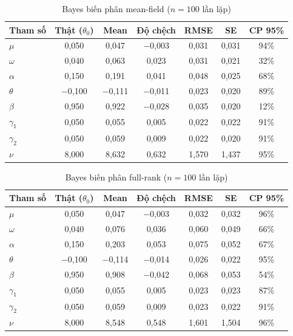 \documentclass[11pt,a4paper]{article}
\begin{document}
\begin{table}[H]\centering\footnotesize
\caption{Bayes biến phân mean-field ($n=100$ lần lặp)}
\begin{tabularx}{\textwidth}{l C C C C C C}
\toprule
\textbf{Tham số} & \textbf{Thật ($\theta_0$)} & \textbf{Mean} & \textbf{Độ chệch} & \textbf{RMSE} & \textbf{SE} & \textbf{CP 95\%} \\
\midrule
$\mu$ & 0,050 & 0,047 & $-$0,003 & 0,031 & 0,031 & 94\% \\
$\omega$ & 0,040 & 0,063 & 0,023 & 0,031 & 0,021 & 32\% \\
$\alpha$ & 0,150 & 0,191 & 0,041 & 0,048 & 0,025 & 68\% \\
$\theta$ & $-$0,100 & $-$0,111 & $-$0,011 & 0,023 & 0,020 & 89\% \\
$\beta$ & 0,950 & 0,922 & $-$0,028 & 0,035 & 0,020 & 12\% \\
$\gamma_1$ & 0,050 & 0,055 & 0,005 & 0,022 & 0,022 & 91\% \\
$\gamma_2$ & 0,050 & 0,059 & 0,009 & 0,022 & 0,020 & 91\% \\
$\nu$ & 8,000 & 8,632 & 0,632 & 1,570 & 1,437 & 95\% \\
\bottomrule
\end{tabularx}
\end{table}

\begin{table}[H]\centering\footnotesize
\caption{Bayes biến phân full-rank ($n=100$ lần lặp)}
\begin{tabularx}{\textwidth}{l C C C C C C}
\toprule
\textbf{Tham số} & \textbf{Thật ($\theta_0$)} & \textbf{Mean} & \textbf{Độ chệch} & \textbf{RMSE} & \textbf{SE} & \textbf{CP 95\%} \\
\midrule
$\mu$ & 0,050 & 0,047 & $-$0,003 & 0,032 & 0,032 & 96\% \\
$\omega$ & 0,040 & 0,076 & 0,036 & 0,060 & 0,049 & 66\% \\
$\alpha$ & 0,150 & 0,203 & 0,053 & 0,075 & 0,052 & 67\% \\
$\theta$ & $-$0,100 & $-$0,114 & $-$0,014 & 0,026 & 0,022 & 95\% \\
$\beta$ & 0,950 & 0,908 & $-$0,042 & 0,068 & 0,053 & 54\% \\
$\gamma_1$ & 0,050 & 0,055 & 0,005 & 0,023 & 0,023 & 87\% \\
$\gamma_2$ & 0,050 & 0,059 & 0,009 & 0,023 & 0,022 & 91\% \\
$\nu$ & 8,000 & 8,548 & 0,548 & 1,601 & 1,504 & 96\% \\
\bottomrule
\end{tabularx}
\end{table}
\end{document}
